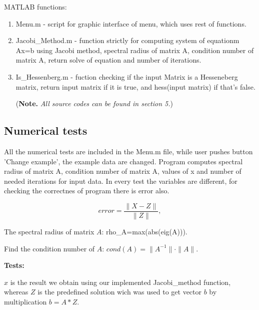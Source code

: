 \documentclass[12pt]{article}
\begin{document}
\pagebreak

\noindent MATLAB functions:
\begin{enumerate}
\item Menu.m - script for graphic interface of menu, which uses rest of functions.
\item Jacobi\_Method.m - function strictly for computing system of equationm Ax=b using Jacobi method, spectral radius of matrix A, condition number of matrix A, return solve of equation and number of iterations.
\item Is\_Hessenberg.m - fuction checking if the input Matrix is a Hesseneberg matrix, return input matrix if it is true, and hess(input matrix) if that's false.

\noindent ({\bf Note.} \emph{All source codes can be found in section 5.})
\end{enumerate}

\vskip20pt

\begin{center}
\section{Numerical tests}
\end{center}

\vskip20pt

\noindent
All the numerical tests are included in the Menu.m file, while user pushes button 'Change example', the example data are changed. Program computes spectral radius of matrix A, condition number of matrix A, values of x and number of needed iterations for input data.
In every test the variables are different, for checking the correctnes of program there is error also.

\[
error=\dfrac{\|X-Z\|}{\|Z\|},
\]

The spectral radius of matrix $A$:
rho\_A=max(abs(eig(A))).

Find the condition number of $A$: 
$cond(A)= \|A^{-1}\|  \cdot  \|A\|$.

\bigskip

\textbf{Tests:}

$x$ is the result we obtain using our implemented Jacobi\_method function, whereas $Z$ is the predefined solution wich was used to get vector $b$ by multiplication $b=A*Z$.
\end{document}
